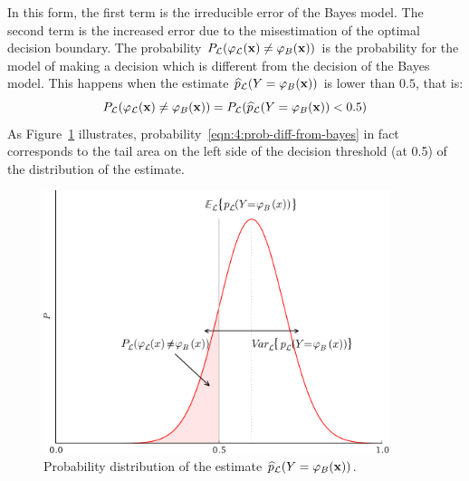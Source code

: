 In this form, the first term is the irreducible error of the Bayes model. The
second term is the increased error due to the misestimation of the optimal
decision boundary. The probability $P_{\cal L}(\varphi_{\cal L}(\mathbf{x})\neq
\varphi_B(\mathbf{x}))$  is the probability for the model of making a decision
which is different from the decision of the Bayes model. This happens
when the estimate $\widehat{p}_{\cal L}(Y=\varphi_B(\mathbf{x}))$ is lower
than $0.5$, that is:
\begin{equation}\label{eqn:4:prob-diff-from-bayes}
P_{\cal L}(\varphi_{\cal L}(\mathbf{x})\neq \varphi_B(\mathbf{x})) = P_{\cal L}(\widehat{p}_{\cal L}(Y=\varphi_B(\mathbf{x})) < 0.5)
\end{equation}
As Figure~\ref{fig:estimate-distribution} illustrates, probability~\ref{eqn:4:prob-diff-from-bayes}
in fact corresponds to the tail area on the left side
of the decision threshold (at 0.5) of the distribution of the estimate.

\begin{figure}
    \centering
    \includegraphics[width=0.9\textwidth]{figures/ch4_estimate_distribution.pdf}
    \caption{Probability distribution of the estimate $\widehat{p}_{\cal L}(Y=\varphi_B(\mathbf{x}))$.}
    \label{fig:estimate-distribution}
\end{figure}

